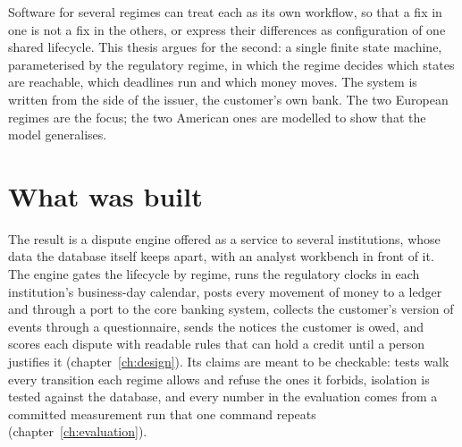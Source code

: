 Software for several regimes can treat each as its own workflow, so that a fix in one is not a fix
in the others, or express their differences as configuration of one shared lifecycle. This thesis
argues for the second: a single finite state machine, parameterised by the regulatory regime, in
which the regime decides which states are reachable, which deadlines run and which money moves.
The system is written from the side of the issuer, the customer's own bank. The two European
regimes are the focus; the two American ones are modelled to show that the model generalises.

\section{What was built}
\label{sec:intro-built}

The result is a dispute engine offered as a service to several institutions, whose data the
database itself keeps apart, with an analyst workbench in front of it. The engine gates the
lifecycle by regime, runs the regulatory clocks in each institution's business-day calendar, posts
every movement of money to a ledger and through a port to the core banking system, collects the
customer's version of events through a questionnaire, sends the notices the customer is owed, and scores
each dispute with readable rules that can hold a credit until a person justifies it
(chapter~\ref{ch:design}). Its claims are meant to be checkable: tests walk every transition each
regime allows and refuse the ones it forbids, isolation is tested against the database, and every
number in the evaluation comes from a committed measurement run that one command repeats
(chapter~\ref{ch:evaluation}).
